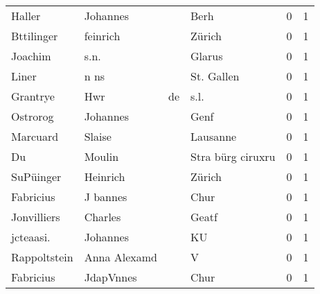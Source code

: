 \begin{tabular}{llllrr}
                   Haller &                           Johannes &             &                                        Berh &          0 &         1 \\
               Bttilinger &                           feinrich &             &                                      Zürich &          0 &         1 \\
                  Joachim &                               s.n. &             &                                      Glarus &          0 &         1 \\
                    Liner &                               n ns &             &                                  St. Gallen &          0 &         1 \\
                 Grantrye &                                Hwr &          de &                                        s.l. &          0 &         1 \\
                 Ostrorog &                           Johannes &             &                                        Genf &          0 &         1 \\
                 Marcuard &                             Slaise &             &                                    Lausanne &          0 &         1 \\
                       Du &                             Moulin &             &                           Stra bürg ciruxru &          0 &         1 \\
                SuPüinger &                           Heinrich &             &                                      Zürich &          0 &         1 \\
                Fabricius &                           J bannes &             &                                        Chur &          0 &         1 \\
              Jonvilliers &                            Charles &             &                                       Geatf &          0 &         1 \\
                jcteaasi. &                           Johannes &             &                                          KU &          0 &         1 \\
             Rappoltstein &                       Anna Alexamd &             &                                           V &          0 &         1 \\
                Fabricius &                          JdapVnnes &             &                                        Chur &          0 &         1 \\

\end{tabular}
